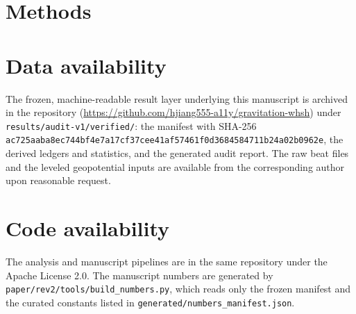 \documentclass[11pt,a4paper]{article}
\begin{document}
\section*{Methods}


\section*{Data availability}
The frozen, machine-readable result layer underlying this manuscript is
archived in the repository
(\url{https://github.com/hjiang555-a11y/gravitation-whsh}) under
\texttt{results/audit-v1/verified/}: the manifest with SHA-256
\texttt{ac725aaba8ec744bf4e7a17cf37cee41af57461f0d3684584711b24a02b0962e},
the derived ledgers and statistics, and the generated audit report. The
raw beat files and the leveled geopotential inputs are available from
the corresponding author upon reasonable request.

\section*{Code availability}
The analysis and manuscript pipelines are in the same repository under the
Apache License 2.0. The manuscript numbers are generated by
\texttt{paper/rev2/tools/build\_numbers.py}, which reads only the frozen
manifest and the curated constants listed in
\texttt{generated/numbers\_manifest.json}.
\end{document}
